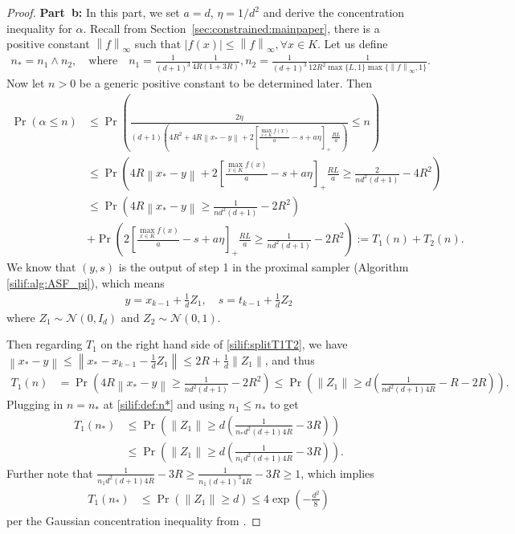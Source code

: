 \documentclass[11pt,letterpaper]{article}
\newcommand{\norm}[1]{\left\lVert #1 \right\rVert}
\newcommand{\abs}[1]{\left\vert #1 \right\rvert}
\newcommand{\brac}[1]{\left( #1\right)}
\begin{document}
\begin{proof}
\textbf{Part~b:} In this part, we set $a=d$, $\eta=1/d^2$ and derive the concentration inequality for $\alpha$. Recall from Section~\ref{sec:constrained:mainpaper}, there is a positive constant $\norm{f}_\infty$ such that $\abs{f(x)}\leq \norm{f}_\infty,\forall x\in K$. Let us define
  \begin{align}
  \label{silif:def:n*}
 n_*=n_1\wedge n_2, \quad\text{where}\quad      n_1=\frac{1}{(d+1)^3}\frac{1}{4R(1+3R)}, n_2=\frac{1}{(d+1)^3}\frac{1}{12R^2 \max\{L,1\}\max\{\norm{f}_\infty,1\} }. 
  \end{align}
Now let $n>0$ be a generic positive constant to be determined later. Then
\begin{align}
\label{silif:splitT1T2}
    \Pr\brac{\alpha\leq n}
    &\leq \Pr\brac{\frac{2\eta}{(d+1)\brac{4R^2+4R\norm{x_*-y}+2 \left[\frac{\max_{x\in K}f(x)}{a}-s+a\eta\right]_{+}\frac{RL}{a} }}\leq n}\nonumber\\
    &\leq \Pr\brac{4R\norm{x_*-y}+2\left[\frac{\max_{x\in K}f(x)}{a}-s+a\eta\right]_{+}\frac{RL}{a}\geq \frac{2}{n d^2(d+1)}-4R^2 }\nonumber\\
    &\leq \Pr\brac{4R\norm{x_*-y}\geq  \frac{1}{n d^2(d+1)}-2R^2}\nonumber\\
    &+\Pr\brac{ 2\left[\frac{\max_{x\in K}f(x)}{a}-s+a\eta\right]_{+}\frac{RL}{a}\geq \frac{1}{n d^2(d+1)}-2R^2}:=T_1(n)+T_2(n). 
\end{align}
We know that $(y,s)$ is the output of step 1 in the proximal sampler (Algorithm \ref{silif:alg:ASF_pi}), which means
\begin{align}
    \label{silif:outputstep1}
    y=x_{k-1}+\frac{1}{d}Z_1,\quad  s=t_{k-1}+\frac{1}{d}Z_2
\end{align}
where $Z_1\sim \mathcal{N}(0,I_d)$ and $Z_2\sim \mathcal{N}(0,1)$. 

Then regarding $T_1$ on the right hand side of \eqref{silif:splitT1T2}, we have $\norm{x_*-y}\leq \norm{x_*-x_{k-1}-\frac{1}{d}Z_1}\leq 2R+\frac{1}{d}\norm{Z_1}$, and thus
\begin{align*}
    T_1(n)&=\Pr\brac{4R\norm{x_*-y}\geq  \frac{1}{n d^2(d+1)}-2R^2}\leq \Pr\brac{\norm{Z_1}\geq d\brac{\frac{1}{nd^2(d+1)4R}-R-2R }}. 
\end{align*}
  Plugging in $n=n_*$ at \eqref{silif:def:n*} and using $n_1\leq n_*$ to get 
  \begin{align*}
      T_1(n_*)&\leq \Pr\brac{\norm{Z_1}\geq d\brac{\frac{1}{n_*d^2(d+1)4R}-3R }}\\
      &\leq \Pr\brac{\norm{Z_1}\geq d\brac{\frac{1}{n_1 d^2(d+1)4R}-3R }}. 
  \end{align*}
Further note that $ \frac{1}{n_1 d^2(d+1)4R}-3R\geq \frac{1}{n_1 (d+1)^3 4R}-3R \geq 1$,
which implies 
\begin{align}
\label{silif:boundT1}
     T_1(n_*)&\leq \Pr\brac{\norm{Z_1}\geq d}\leq 4\exp\brac{-\frac{d^2}{8}} 
\end{align}
per the Gaussian concentration inequality from \cite[Equation (3.5)]{ledoux2013probability}. 


\end{proof}
\end{document}
